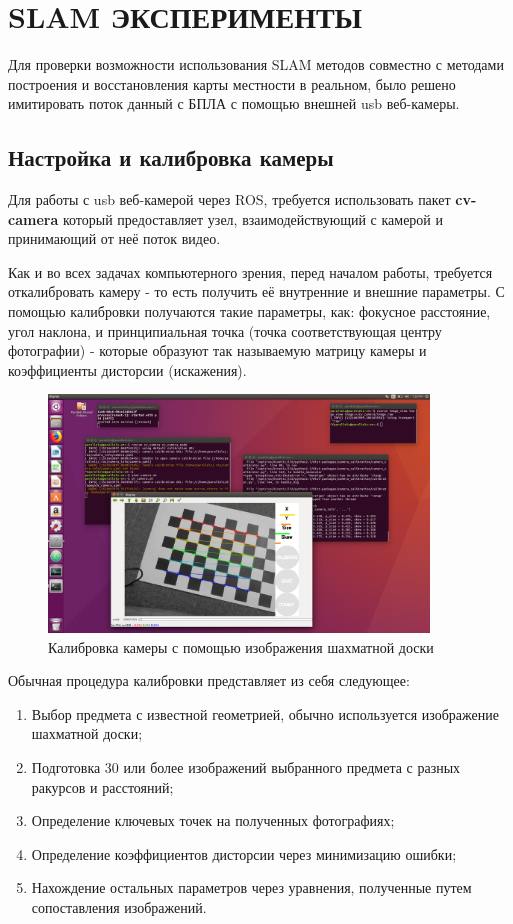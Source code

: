 \chapter{SLAM ЭКСПЕРИМЕНТЫ}

Для проверки возможности использования SLAM методов совместно с методами построения и восстановления карты местности в реальном, было решено имитировать поток данный с БПЛА с помощью внешней usb веб-камеры.

\section{Настройка и калибровка камеры}

Для работы с usb веб-камерой через ROS, требуется использовать пакет \textbf{cv-camera} который предоставляет узел, взаимодействующий с камерой и принимающий от неё поток видео.

Как и во всех задачах компьютерного зрения, перед началом работы, требуется откалибровать камеру - то есть получить её внутренние и внешние параметры. С помощью калибровки получаются такие параметры, как: фокусное расстояние, угол наклона, и принципиальная точка (точка соответствующая центру фотографии) - которые образуют так называемую матрицу камеры и коэффициенты дисторсии (искажения).

\begin{figure}[h]
    \centering
    \includegraphics[width=0.9\textwidth]{images/chess.png}
    \caption{Калибровка камеры с помощью изображения шахматной доски}
    \label{fig:chess}
\end{figure}

Обычная процедура калибровки представляет из себя следующее:

\begin{enumerate}
    \item Выбор предмета с известной геометрией, обычно используется изображение шахматной доски;
    \item Подготовка 30 или более изображений выбранного предмета с разных ракурсов и расстояний;
    \item Определение ключевых точек на полученных фотографиях;
    \item Определение коэффициентов дисторсии через минимизацию ошибки;
    \item Нахождение остальных параметров через уравнения, полученные путем сопоставления изображений.
\end{enumerate}
 

